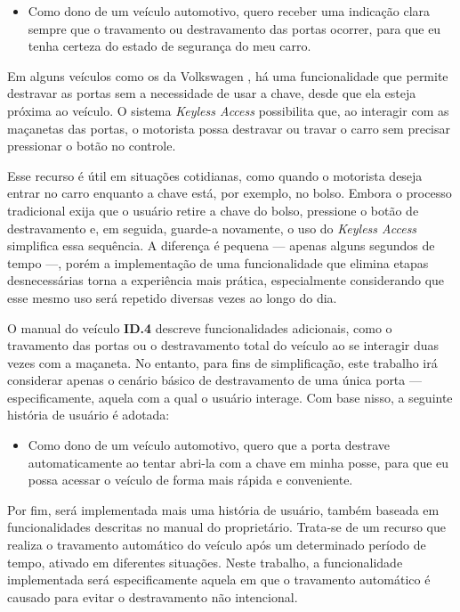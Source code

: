 \begin{itemize}
    \item Como dono de um veículo automotivo, quero receber uma indicação clara sempre que o travamento ou destravamento das portas ocorrer, para que eu tenha certeza do estado de segurança do meu carro.
\end{itemize}

Em alguns veículos como os da Volkswagen \cite{vwLocking}, há uma funcionalidade que permite destravar as portas sem a necessidade de usar a chave, desde que ela 
esteja próxima ao veículo. O sistema \textit{Keyless Access} possibilita que, ao interagir com as maçanetas das portas, o motorista possa destravar ou travar o carro sem 
precisar pressionar o botão no controle.

Esse recurso é útil em situações cotidianas, como quando o motorista deseja entrar no carro enquanto a chave está, por exemplo, no bolso. Embora o processo 
tradicional exija que o usuário retire a chave do bolso, pressione o botão de destravamento e, em seguida, guarde-a novamente, o uso do \textit{Keyless Access} simplifica 
essa sequência. A diferença é pequena — apenas alguns segundos de tempo —, porém a implementação de uma funcionalidade que elimina etapas desnecessárias torna a 
experiência mais prática, especialmente considerando que esse mesmo uso será repetido diversas vezes ao longo do dia.

O manual do veículo \textbf{ID.4} descreve funcionalidades adicionais, como o travamento das portas ou o destravamento total do veículo ao se interagir duas vezes com a maçaneta. 
No entanto, para fins de simplificação, este trabalho irá considerar apenas o cenário básico de destravamento de uma única porta — especificamente, aquela com a 
qual o usuário interage. Com base nisso, a seguinte história de usuário é adotada:

\begin{itemize}
    \item Como dono de um veículo automotivo, quero que a porta destrave automaticamente ao tentar abri-la com a chave em minha posse, para que eu possa acessar o veículo de forma mais rápida e conveniente.
\end{itemize}

Por fim, será implementada mais uma história de usuário, também baseada em funcionalidades descritas no manual do proprietário. Trata-se de um recurso que realiza o 
travamento automático do veículo após um determinado período de tempo, ativado em diferentes situações. Neste trabalho, a funcionalidade implementada será especificamente 
aquela em que o travamento automático é causado para evitar o destravamento não intencional.

